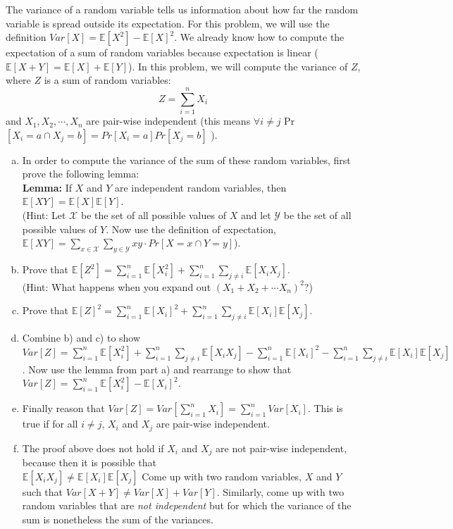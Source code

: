 \documentclass[]{article}
\def \exx {\mathbb{E}}
\begin{document}
\begin{qunlist}
The variance of a random variable tells us information about how far the random variable is spread outside its expectation. For this problem, we will use the definition $Var[X] = \exx[X^2] - \exx[X]^2$.  We already know how to compute the expectation of a sum of random variables because expectation is linear ($\mathbb{E}[X+Y] = \mathbb{E}[X] + \mathbb{E}[Y]$). In this problem, we will compute the variance of $Z$, where $Z$ is a sum of random variables:
\[ Z = \sum_{i=1}^n X_i \]
and $X_1, X_2, \cdots, X_n$ are pair-wise independent (this means $\forall{i \neq} j $ Pr$[X_i = a \cap X_j = b] = Pr[X_i = a]Pr[X_j = b]$ ).
\begin{enumerate}[a)]
\qpart
\item In order to compute the variance of the sum of these random variables, first  prove the following lemma: \\ \textbf{Lemma:} If $X$ and $Y$ are independent random variables, then $\exx[XY] = \exx[X] \exx[Y]$. \\ 
(Hint: Let $\mathcal{X}$ be the set of all possible values of $X$ and let $\mathcal{Y}$ be the set of all possible values of $Y$. Now use the definition of expectation, $\exx[XY] = \sum\limits_{x \in \mathcal{X}} \sum\limits_{y \in \mathcal{Y}} xy \cdot Pr[X=x \cap Y = y]$).
\qpart
\item
Prove that $\exx[Z^2] = \sum\nolimits_{i=1}^n \exx[X_i^2] + \sum_{i=1}^n \sum_{j \neq i} \exx[X_iX_j]$. \\ 
(Hint: 
What happens when you expand out $(X_1 + X_2 + \cdots X_n)^2$?)
\qpart
\item Prove that $\exx[Z]^2 = \sum\nolimits_{i=1}^n \exx[X_i]^2 + \sum_{i=1}^n \sum\limits_{j \neq i} \exx[X_i] \exx[X_j]$.
\qpart
\item Combine b) and c) to show $Var[Z] = \sum\nolimits_{i=1}^n \exx[X_i^2] + \sum_{i=1}^n \sum\limits_{j \neq i} \exx[X_iX_j] -  \sum\nolimits_{i=1}^n \exx[X_i]^2 - \sum_{i=1}^n \sum\limits_{j \neq i} \exx[X_i] \exx[X_j]$. Now use the lemma from part a) and rearrange to show that $Var[Z] = \sum\nolimits_{i=1}^n \exx[X_i^2] - \exx[X_i]^2$.
\qpart
\item Finally reason that $Var[Z] = Var[\sum\nolimits_{i=1}^n X_i] =    \sum\nolimits_{i=1}^n Var[X_i]$. This is true if for all $i \neq j$, $X_i$ and $X_j$ are pair-wise independent.
\qpart
\item The proof above does not hold if $X_i$ and $X_j$ are not pair-wise
  independent, because then it is possible that \\ $\exx[X_iX_j] \neq
  \exx[X_i]\exx[X_j]$ Come up with two random variables, $X$ and $Y$
  such that $Var[X+Y] \neq Var[X] + Var[Y]$. Similarly, come up with
  two random variables that are {\em not independent} but for which
  the variance of the sum is nonetheless the sum of the variances.


\end{enumerate}
\end{qunlist}
\end{document}
